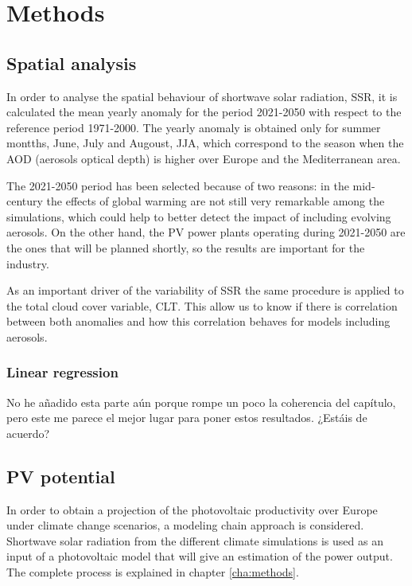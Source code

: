 \section{Methods}

\subsection{Spatial analysis}

In order to analyse the spatial behaviour of shortwave solar radiation, SSR, it is calculated the mean yearly anomaly for the period 2021-2050 with respect to the reference period 1971-2000. The yearly anomaly is obtained only for summer montths, June, July and Augoust, JJA, which correspond to the season when the AOD (aerosols optical depth) is higher over Europe and the Mediterranean area.

The 2021-2050 period has been selected because of two reasons: in the mid-century the effects of global warming are not still very remarkable among the simulations, which could help to better detect the impact of including evolving aerosols. On the other hand, the PV power plants operating during 2021-2050 are the ones that will be planned shortly, so the results are important for the industry.

As an important driver of the variability of SSR the same procedure is applied to the total cloud cover variable, CLT. This allow us to know if there is correlation between both anomalies and how this correlation behaves for models including aerosols.

\subsubsection{Linear regression}

{\color{red} No he añadido esta parte aún porque rompe un poco la coherencia del capítulo, pero este me parece el mejor lugar para poner estos resultados. ¿Estáis de acuerdo?}

\subsection{PV potential}

In order to obtain a projection of the photovoltaic productivity over Europe under climate change scenarios, a modeling chain approach is considered. Shortwave solar radiation from the different climate simulations is used as an input of a photovoltaic model that will give an estimation of the power output. The complete process is explained in chapter \ref{cha:methods}.

